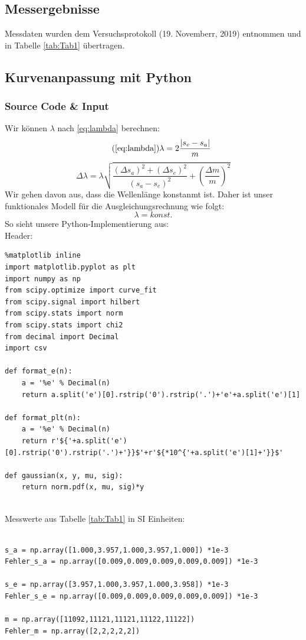 \documentclass[a4paper,10pt]{article}
\begin{document}
\subsection{Messergebnisse}
Messdaten wurden dem Versuchsprotokoll (19. Novemberr, 2019) entnommen und in Tabelle \ref{tab:Tab1} übertragen.
\subsection{Kurvenanpassung mit Python}
\subsubsection{Source Code \& Input}
Wir können \(\lambda\) nach \eqref{eq:lambda} berechnen:
\begin{equation} \tag{\ref{eq:lambda}}
	\lambda = 2 \frac{|s_e - s_a |}{m}
\end{equation}
\begin{equation} \label{eq:Deltalambda}
	\Delta \lambda = \lambda \sqrt{\frac{{\left(\Delta s_a\right)}^2+{\left(\Delta s_e\right)}^2}{\left(s_a - s_e\right)^2}+\left(\frac{\Delta m}{m}\right)^2}
\end{equation}
Wir gehen davon aus, dass die Wellenlänge  konstanmt ist.
Daher ist unser funktionales Modell für die Ausgleichungsrechnung wie folgt:
\begin{equation} \label{eq:Fit1}
	\boxed{\lambda = konst.}
\end{equation} 
So sieht unsere Python-Implementierung aus:\\

Header:
\begin{lstlisting}
%matplotlib inline
import matplotlib.pyplot as plt
import numpy as np
from scipy.optimize import curve_fit
from scipy.signal import hilbert
from scipy.stats import norm
from scipy.stats import chi2
from decimal import Decimal
import csv

def format_e(n):
    a = '%e' % Decimal(n)
    return a.split('e')[0].rstrip('0').rstrip('.')+'e'+a.split('e')[1]

def format_plt(n):
    a = '%e' % Decimal(n)
    return r'${'+a.split('e')[0].rstrip('0').rstrip('.')+'}}$'+r'${*10^{'+a.split('e')[1]+'}}$'
    
def gaussian(x, y, mu, sig):
    return norm.pdf(x, mu, sig)*y
    
\end{lstlisting}

Messwerte aus Tabelle \ref{tab:Tab1} in SI Einheiten:
\begin{lstlisting}

s_a = np.array([1.000,3.957,1.000,3.957,1.000]) *1e-3
Fehler_s_a = np.array([0.009,0.009,0.009,0.009,0.009]) *1e-3

s_e = np.array([3.957,1.000,3.957,1.000,3.958]) *1e-3
Fehler_s_e = np.array([0.009,0.009,0.009,0.009,0.009]) *1e-3

m = np.array([11092,11121,11121,11122,11122]) 
Fehler_m = np.array([2,2,2,2,2])

\end{lstlisting}
\end{document}
